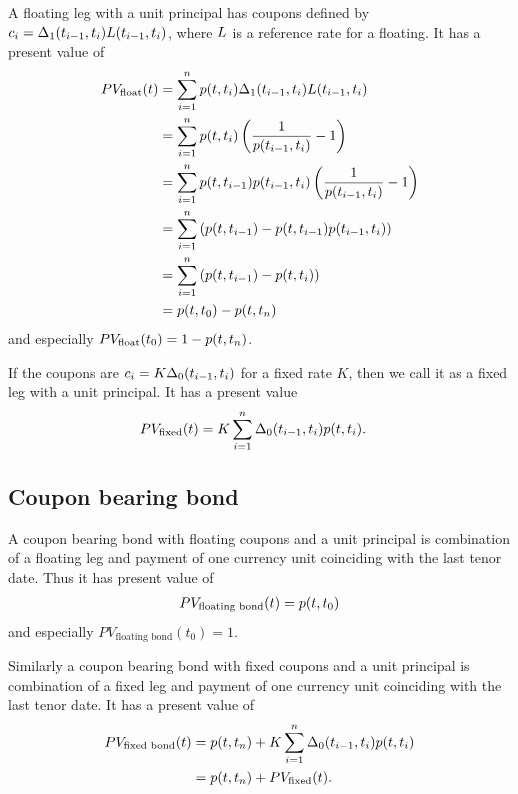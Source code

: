 A floating leg with a unit principal has coupons defined by $c_i = \Delta_1(t_{i-1}, t_i) L(t_{i-1}, t_i)$, where $L$ is a reference rate for a floating. It has a present value of
\begin{align}
PV_{\text{float}}(t) &= \sum_{i=1}^n p (t,t_i) \Delta_1(t_{i-1}, t_i) L(t_{i-1}, t_i) \\ 
	&= \sum_{i=1}^n p (t,t_i) \left( \frac{1}{p(t_{i-1},t_i)} -1 \right) \\
	&= \sum_{i=1}^n p (t,t_{i-1}) p (t_{i-1},t_i) \left( \frac{1}{p(t_{i-1},t_i)} -1 \right) \\
	&= \sum_{i=1}^n \left( p (t,t_{i-1}) - p (t,t_{i-1})p (t_{i-1},t_i) \right) \\
	&= \sum_{i=1}^n \left( p (t,t_{i-1}) - p (t,t_i) \right) \\
	&= p (t,t_{0}) - p (t,t_n)
\end{align}
and especially $PV_{\text{float}}(t_0) = 1 - p (t,t_n)$.

If the coupons are $c_i = K \Delta_0(t_{i-1}, t_i)$ for a fixed rate $K$, then we call it as a fixed leg with a unit principal. It has a present value
  	\begin{align}
		PV_{\text{fixed}}(t) &= K \sum_{i=1}^n  \Delta_0(t_{i-1}, t_i) p (t,t_i) .
	\end{align}
	
\subsection{Coupon bearing bond}

A coupon bearing bond with floating coupons and a unit principal is combination of a floating leg and payment of one currency unit coinciding with the last tenor date. Thus it has present value of
\begin{align}
PV_{\text{floating bond}}(t) = p (t,t_{0})
\end{align}
and especially $PV_{\text{floating bond}}(t_0) = 1$.

Similarly a coupon bearing bond with fixed coupons and a unit principal is combination of a fixed leg and payment of one currency unit coinciding with the last tenor date. It has a present value of
	\begin{align}
		PV_{\text{fixed bond}}(t) &= p (t,t_n) + K \sum_{i=1}^n  \Delta_0(t_{i-1}, t_i) p (t,t_i) \\
		&= p (t,t_n) + PV_{\text{fixed}}(t) .
	\end{align}
		

